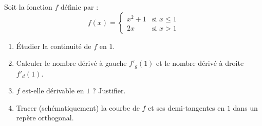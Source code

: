 \documentclass[11pt]{article}
\begin{document}
\begin{exercice}
Soit la fonction $f$ définie par :
\[
f(x) = \begin{cases}
x^2 + 1 & \text{si } x \leq 1 \\
2x & \text{si } x > 1
\end{cases}
\]
\begin{enumerate}
    \item Étudier la continuité de $f$ en $1$.
    \item Calculer le nombre dérivé à gauche $f'_g(1)$ et le nombre dérivé à droite $f'_d(1)$.
    \item $f$ est-elle dérivable en $1$ ? Justifier.
    \item Tracer (schématiquement) la courbe de $f$ et ses demi-tangentes en $1$ dans un repère orthogonal.
\end{enumerate}
\end{exercice}
\end{document}
